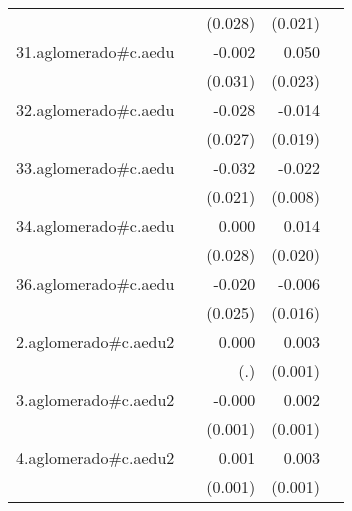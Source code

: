 {\begin{longtable}{l*{4}{D{.}{.}{-1}}}
            &                     &     (0.028)         &     (0.021)         &                     \\
\addlinespace
31.aglomerado#c.aedu&                     &      -0.002         &       0.050\sym{*}  &                     \\
            &                     &     (0.031)         &     (0.023)         &                     \\
\addlinespace
32.aglomerado#c.aedu&                     &      -0.028         &      -0.014         &                     \\
            &                     &     (0.027)         &     (0.019)         &                     \\
\addlinespace
33.aglomerado#c.aedu&                     &      -0.032         &      -0.022\sym{**} &                     \\
            &                     &     (0.021)         &     (0.008)         &                     \\
\addlinespace
34.aglomerado#c.aedu&                     &       0.000         &       0.014         &                     \\
            &                     &     (0.028)         &     (0.020)         &                     \\
\addlinespace
36.aglomerado#c.aedu&                     &      -0.020         &      -0.006         &                     \\
            &                     &     (0.025)         &     (0.016)         &                     \\
\addlinespace
2.aglomerado#c.aedu2&                     &       0.000         &       0.003\sym{**} &                     \\
            &                     &         (.)         &     (0.001)         &                     \\
\addlinespace
3.aglomerado#c.aedu2&                     &      -0.000         &       0.002\sym{**} &                     \\
            &                     &     (0.001)         &     (0.001)         &                     \\
\addlinespace
4.aglomerado#c.aedu2&                     &       0.001         &       0.003\sym{***}&                     \\
            &                     &     (0.001)         &     (0.001)         &                     \\

\end{longtable}}
